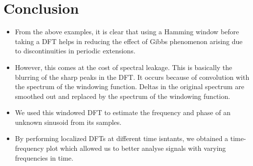 \documentclass{article}
\begin{document}
\section{Conclusion}
\begin{itemize}
    \item
      From the above examples, it is clear that using a Hamming window
      before taking a DFT helps in reducing the effect of Gibbs phenomenon
      arising due to discontinuities in periodic extensions.
    \item
      However, this comes at the cost of spectral leakage. This is basically
      the blurring of the sharp peaks in the DFT. It occurs because of
      convolution with the spectrum of the windowing function. Deltas in the
      original spectrum are smoothed out and replaced by the spectrum of the
      windowing function.
    \item
      We used this windowed DFT to estimate the frequency and phase of an
      unknown sinusoid from its samples.
    \item
      By performing localized DFTs at different time isntants, we obtained a
      time-frequency plot which allowed us to better analyse signals with
      varying frequencies in time.
    \end{itemize}
    
\end{document}
